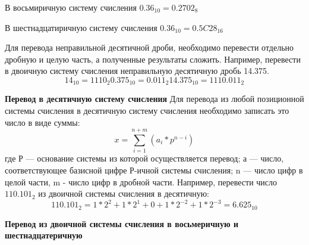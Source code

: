 \documentclass[a4paper]{article}
\begin{document}
В восьмиричную систему счисления $0.36_{10}=0.2702_{8}$

\begin{figure}[h]
\end{figure}

В шестнадцатиричную систему счисления $0.36_{10}=0.5C28_{16}$

\begin{figure}[h]
\end{figure}

Для перевода неправильной десятичной дроби, необходимо перевести отдельно дробную и целую часть, а полученные результаты сложить. Например, перевести в двоичную систему счисления неправильную десятичную дробь 14.375.
$$14_{10}=1110_{2} 0.375_{10}=0.011_{2} 14.375_{10}=1110.011_{2}$$

\textbf{Перевод в десятичную систему счисления}
Для перевода из любой позиционной системы счисления в десятичную систему счисления необходимо записать это число в виде суммы:
$$x = \sum^{n+m}_{i=1}(a_{i}*p^{n-i})$$
где Р --- основание системы из которой осуществляется перевод;\newline
а --- число, соответствующее базисной цифре Р-ичной системы счисления;\newline
n --- число цифр в целой части, m - число цифр в дробной части.\newline
Например, перевести число $110.101_{2}$ из двоичной системы счисления в десятичную:
$$110.101_{2} = 1 * 2^{2} + 1 * 2^{1} + 0 + 1 * 2^{-2} + 1 * 2^{-3} = 6.625_{10}$$

\textbf{Перевод из двоичной системы счисления в восьмеричную и шестнадцатеричную}
\end{document}
